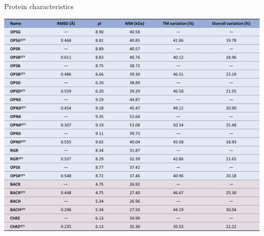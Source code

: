 \documentclass[fleqn,10pt,lineno]{manuscript}
\begin{document}


\begin{table}[h]
	\centering
	\caption{Protein characteristics}
	\label{tb:characteristics}
	\includegraphics[width=\linewidth]{figures/characteristics.jpg}
\end{table}
\end{document}
